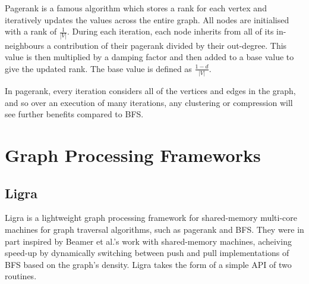 Pagerank is a famous algorithm which stores a rank for each vertex and iteratively updates the values
across the entire graph. All nodes are initialised with a rank of $\frac{1}{|V|}$. During each
iteration, each node inherits from all of its in-neighbours a contribution of their pagerank divided
by their out-degree. This value is then multiplied by a damping factor and then added to a base value
to give the updated rank. The base value is defined as $\frac{1 - d}{|V|}$.

In pagerank, every iteration considers all of the vertices and edges in the graph, and so over
an execution of many iterations, any clustering or compression will see further benefits compared to
BFS.

\section{Graph Processing Frameworks}

\subsection{Ligra}

Ligra is a lightweight graph processing framework for shared-memory multi-core machines for graph
traversal algorithms, such as pagerank and BFS. They were in part inspired by Beamer et al.'s work
with shared-memory machines, acheiving speed-up by dynamically switching between push and pull implementations of BFS based on the graph's density. Ligra takes the form of a simple API of two
routines.

